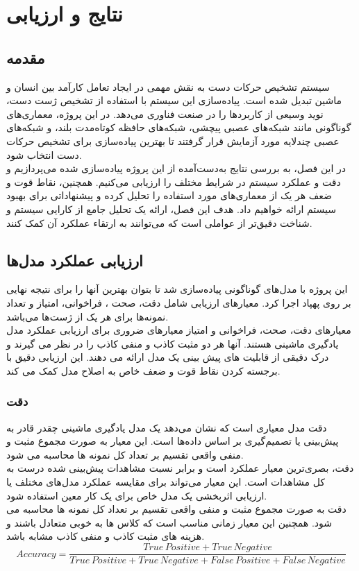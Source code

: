\chapter{نتایج و ارزیابی}
\section{مقدمه}
سیستم تشخیص حرکات دست به نقش مهمی در ایجاد تعامل کارآمد بین انسان و ماشین تبدیل شده است. پیاده‌سازی این سیستم با استفاده از تشخیص ژست دست، نوید وسیعی از کاربردها را در صنعت فناوری می‌دهد. در این پروژه، 
معماری‌های گوناگونی مانند شبکه‌های عصبی پیچشی، شبکه‌های حافظه کوتاه‌مدت بلند، و شبکه‌های عصبی چندلایه مورد آزمایش قرار گرفتند تا بهترین پیاده‌سازی برای تشخیص حرکات دست انتخاب شود. 
\\
در این فصل، به بررسی نتایج به‌دست‌آمده از این پروژه پیاده‌سازی شده می‌پردازیم و دقت و عملکرد سیستم در شرایط مختلف را ارزیابی می‌کنیم. همچنین، نقاط قوت و ضعف هر یک از معماری‌های مورد استفاده 
را تحلیل کرده و پیشنهاداتی برای بهبود سیستم ارائه خواهیم داد. هدف این فصل، ارائه یک تحلیل جامع از کارایی سیستم و شناخت دقیق‌تر از عواملی است که می‌توانند به ارتقاء عملکرد آن کمک کنند.


\section{ارزیابی عملکرد مدل‌ها}

این پروژه با مدل‌های گوناگونی پیاده‌سازی شد تا بتوان بهترین آنها را برای نتیجه نهایی بر روی پهپاد اجرا کرد. معیارهای ارزیابی شامل دقت، صحت ، فراخوانی، امتیاز  و
تعداد نمونه‌ها برای هر یک از ژست‌ها می‌باشد.
\\
معیار‌های دقت، صحت، فراخوانی و امتیاز  معیارهای ضروری برای ارزیابی عملکرد مدل یادگیری ماشینی هستند. آنها هر دو مثبت کاذب و منفی کاذب را در نظر
می گیرند و درک دقیقی از قابلیت های پیش بینی یک مدل ارائه می دهند. این ارزیابی دقیق با برجسته کردن نقاط قوت و ضعف خاص به اصلاح مدل کمک می کند.


\subsection{دقت}
دقت مدل معیاری است که نشان می‌دهد یک مدل یادگیری ماشینی چقدر قادر به پیش‌بینی یا تصمیم‌گیری بر اساس داده‌ها است. این معیار به صورت مجموع مثبت و منفی واقعی تقسیم بر تعداد کل نمونه ها محاسبه می شود.
\\
دقت، بصری‌ترین معیار عملکرد است و برابر نسبت مشاهدات پیش‌بینی شده درست به کل مشاهدات است. این معیار می‌تواند برای مقایسه عملکرد مدل‌های مختلف یا ارزیابی اثربخشی یک مدل خاص برای یک کار معین استفاده شود.
\\
دقت به صورت مجموع مثبت و منفی واقعی تقسیم بر تعداد کل نمونه ها محاسبه می شود. همچنین این معیار زمانی مناسب است که کلاس ها به خوبی متعادل باشند و هزینه های مثبت کاذب و منفی کاذب مشابه باشد.
\[ Accuracy = \frac{True \, Positive + True \, Negative}{True \, Positive + True \, Negative +  False \, Positive + False \, Negative} \]

